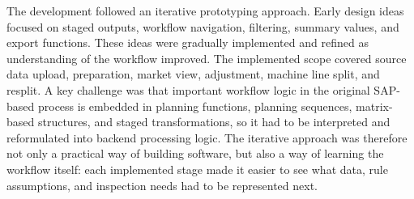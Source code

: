 The development followed an iterative prototyping approach. Early design ideas focused on staged outputs, workflow navigation, filtering, summary values, and export functions. These ideas were gradually implemented and refined as understanding of the workflow improved. The implemented scope covered source data upload, preparation, market view, adjustment, machine line split, and resplit. A key challenge was that important workflow logic in the original SAP-based process is embedded in planning functions, planning sequences, matrix-based structures, and staged transformations, so it had to be interpreted and reformulated into backend processing logic. The iterative approach was therefore not only a practical way of building software, but also a way of learning the workflow itself: each implemented stage made it easier to see what data, rule assumptions, and inspection needs had to be represented next.












